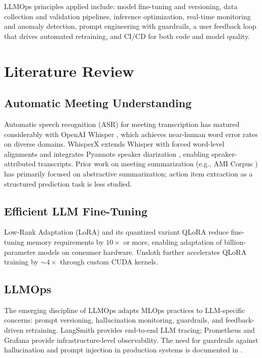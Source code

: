 \documentclass[12pt,a4paper]{article}
\begin{document}
LLMOps principles applied include: model fine-tuning and versioning, data collection and validation pipelines, inference optimization, real-time monitoring and anomaly detection, prompt engineering with guardrails, a user feedback loop that drives automated retraining, and CI/CD for both code and model quality.

\section{Literature Review}

\subsection{Automatic Meeting Understanding}
Automatic speech recognition (ASR) for meeting transcription has matured considerably with OpenAI Whisper \cite{radford2023whisper}, which achieves near-human word error rates on diverse domains. WhisperX \cite{bain2023whisperx} extends Whisper with forced word-level alignments and integrates Pyannote speaker diarization \cite{bredin2023pyannote}, enabling speaker-attributed transcripts. Prior work on meeting summarization (e.g., AMI Corpus \cite{carletta2005ami}) has primarily focused on abstractive summarization; action item extraction as a structured prediction task is less studied.

\subsection{Efficient LLM Fine-Tuning}
Low-Rank Adaptation (LoRA) \cite{hu2021lora} and its quantized variant QLoRA \cite{dettmers2023qlora} reduce fine-tuning memory requirements by $10\times$ or more, enabling adaptation of billion-parameter models on consumer hardware. Unsloth \cite{unsloth2024} further accelerates QLoRA training by $\sim4\times$ through custom CUDA kernels.

\subsection{LLMOps}
The emerging discipline of LLMOps adapts MLOps practices to LLM-specific concerns: prompt versioning, hallucination monitoring, guardrails, and feedback-driven retraining. LangSmith \cite{langchain2024} provides end-to-end LLM tracing; Prometheus and Grafana provide infrastructure-level observability. The need for guardrails against hallucination and prompt injection in production systems is documented in \cite{rebedea2023nemo, perez2022ignore}.
\end{document}
